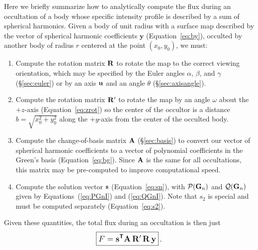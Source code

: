 \documentclass[modern]{aastex61}
\begin{document}
Here we briefly summarize how to analytically compute the flux during
an occultation of a body whose specific intensity profile is described
by a sum of spherical harmonics. Given a body of unit radius with a
surface map described by the vector of spherical harmonic coefficients
$\mathbf{y}$ (Equation~\ref{eq:by}), occulted by another body of radius $r$
centered at the point $(x_0, y_0)$, we must:
%
\begin{enumerate}
    \item Compute the rotation matrix ${\mathbf{R}}$ to rotate the map to the correct
          viewing orientation, which may be
          specified by the Euler angles $\alpha$, $\beta$, and $\gamma$
          (\S\ref{sec:euler}) or by an axis ${\mathbf{u}}$ and an angle $\theta$
          (\S\ref{sec:axisangle}).
    \item Compute the rotation matrix ${\mathbf{R'}}$ to rotate the map
          by an angle $\omega$ about the $+z$-axis
          (Equation~\ref{eq:zrot}) so the center of the occultor is a
          distance $b = \sqrt{x_0^2 + y_0^2}$ along the $+y$-axis
          from the center of the occulted body.
    \item Compute the change-of-basis matrix ${\mathbf{A}}$ (\S\ref{sec:basis}) to
          convert our vector of spherical harmonic coefficients to a vector
          of polynomial coefficients in the Green's basis
          (Equation~\ref{eq:bg}). Since ${\mathbf{A}}$ is the same for all
          occultations, this matrix may be pre-computed to improve
          computational speed.
    \item Compute the solution vector ${\mathbf{s}}$ (Equation~\ref{eq:sn}), with
          $\mathcal{P}({\mathbf{G}}_n)$ and $\mathcal{Q}({\mathbf{G}}_n)$ given by
          Equations~(\ref{eq:PGnI}) and (\ref{eq:QGnI}). Note that $s_2$
          is special and must be computed separately (Equation~\ref{eq:s2}).
\end{enumerate}
%
Given these quantities, the total flux during an occultation is then just
%
\begin{equation}
    \label{eq:starry}
    \boxed{
        \large
        F = \bvec{s}^{\boldsymbol{\mathsf{T}}} \bvec{A} \, \bvec{R'} \, \bvec{R} \, \bvec{y}
        }
    \quad.
\end{equation}


\pagebreak
\end{document}
